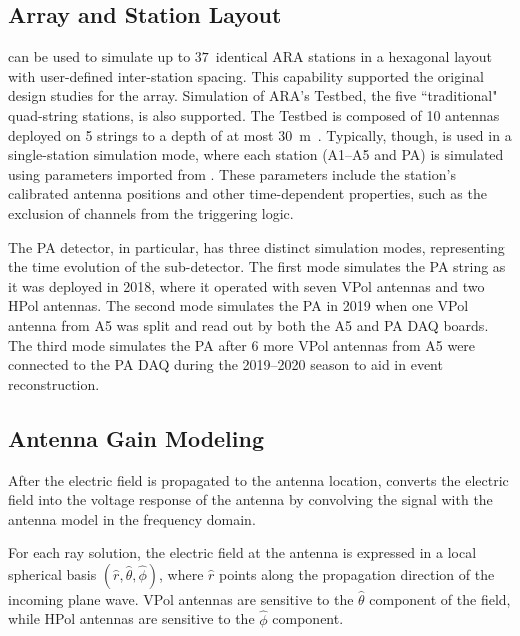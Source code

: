         \subsection{Array and Station Layout}
        
            \arasim{} can be used to simulate up to $37$~identical ARA stations in a hexagonal layout with user-defined inter-station spacing.
            This capability supported the original design studies for the array.
            Simulation of ARA's Testbed, the five ``traditional" quad-string stations, is also supported.
            The Testbed is composed of 10 antennas deployed on 5 strings to a depth of at most 30~m~\citep{ara_design}.
            Typically, though, \arasim{} is used in a single-station simulation mode, where each station (A1--A5 and PA) is simulated using parameters imported from \araroot{}.
            These parameters include the station's calibrated antenna positions and other time-dependent properties, such as the exclusion of channels from the triggering logic.
            
            The PA detector, in particular, has three distinct simulation modes,
            representing the time evolution of the sub-detector.
            The first mode simulates the PA string as it was deployed in 2018,
            where it operated with seven VPol antennas and two HPol antennas.
            The second mode simulates the PA in 2019 when one VPol antenna from A5 was split and read out by both the A5 and PA DAQ boards.
            The third mode simulates the PA after 6 more VPol antennas from A5 were connected to the PA DAQ during the 2019--2020 season to aid in event reconstruction.
            
        \subsection{Antenna Gain Modeling \label{app:antenna}}

        After the electric field is propagated to the antenna location, \arasim{} converts the electric field into the voltage response of the antenna by convolving the signal with the antenna model in the frequency domain.

        For each ray solution, the electric field at the antenna is expressed in a local spherical basis $(\hat{r},\hat{\theta},\hat{\phi})$, where $\hat{r}$ points along the propagation direction of the incoming plane wave.
        VPol antennas are sensitive to the $\hat{\theta}$ component of the field, while HPol antennas are sensitive to the $\hat{\phi}$ component.
        
